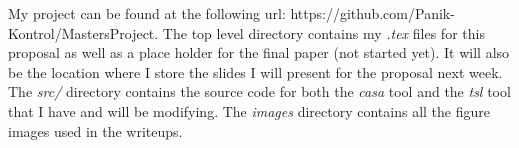 \documentclass[a4full,12pt]{article}
\begin{document}
My project can be found at the following url: https://github.com/Panik-Kontrol/MastersProject.
  The top level directory contains my \emph{.tex} files for this proposal as well as a place
  holder for the final paper (not started yet). It will also be the location where I store the
  slides I will present for the proposal next week. The \emph{src/} directory contains the source
  code for both the \emph{casa} tool and the \emph{tsl} tool that I have and will be modifying.
  The \emph{images} directory contains all the figure images used in the writeups.
\end{document}
